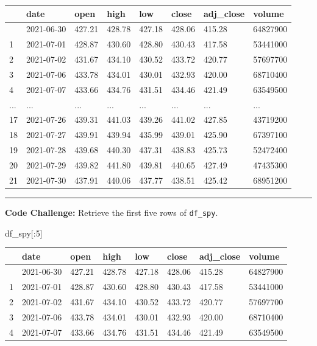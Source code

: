 \documentclass[
  letterpaper,
  DIV=11,
  numbers=noendperiod]{scrreprt}
\newenvironment{Shaded}{\begin{snugshade}}{\end{snugshade}}
\newcommand{\DecValTok}[1]{\textcolor[rgb]{0.68,0.00,0.00}{#1}}
\newcommand{\NormalTok}[1]{\textcolor[rgb]{0.00,0.23,0.31}{#1}}
\begin{document}
\begin{longtable}[]{@{}llllllll@{}}
\toprule\noalign{}
& date & open & high & low & close & adj\_close & volume \\
\midrule\noalign{}
\endhead
\bottomrule\noalign{}
\endlastfoot
0 & 2021-06-30 & 427.21 & 428.78 & 427.18 & 428.06 & 415.28 &
64827900 \\
1 & 2021-07-01 & 428.87 & 430.60 & 428.80 & 430.43 & 417.58 &
53441000 \\
2 & 2021-07-02 & 431.67 & 434.10 & 430.52 & 433.72 & 420.77 &
57697700 \\
3 & 2021-07-06 & 433.78 & 434.01 & 430.01 & 432.93 & 420.00 &
68710400 \\
4 & 2021-07-07 & 433.66 & 434.76 & 431.51 & 434.46 & 421.49 &
63549500 \\
... & ... & ... & ... & ... & ... & ... & ... \\
17 & 2021-07-26 & 439.31 & 441.03 & 439.26 & 441.02 & 427.85 &
43719200 \\
18 & 2021-07-27 & 439.91 & 439.94 & 435.99 & 439.01 & 425.90 &
67397100 \\
19 & 2021-07-28 & 439.68 & 440.30 & 437.31 & 438.83 & 425.73 &
52472400 \\
20 & 2021-07-29 & 439.82 & 441.80 & 439.81 & 440.65 & 427.49 &
47435300 \\
21 & 2021-07-30 & 437.91 & 440.06 & 437.77 & 438.51 & 425.42 &
68951200 \\
\end{longtable}

\begin{center}\rule{0.5\linewidth}{0.5pt}\end{center}

\textbf{Code Challenge:} Retrieve the first five rows of
\texttt{df\_spy}.

\begin{Shaded}
\begin{Highlighting}[]
\NormalTok{df\_spy[:}\DecValTok{5}\NormalTok{]}
\end{Highlighting}
\end{Shaded}

\begin{longtable}[]{@{}llllllll@{}}
\toprule\noalign{}
& date & open & high & low & close & adj\_close & volume \\
\midrule\noalign{}
\endhead
\bottomrule\noalign{}
\endlastfoot
0 & 2021-06-30 & 427.21 & 428.78 & 427.18 & 428.06 & 415.28 &
64827900 \\
1 & 2021-07-01 & 428.87 & 430.60 & 428.80 & 430.43 & 417.58 &
53441000 \\
2 & 2021-07-02 & 431.67 & 434.10 & 430.52 & 433.72 & 420.77 &
57697700 \\
3 & 2021-07-06 & 433.78 & 434.01 & 430.01 & 432.93 & 420.00 &
68710400 \\
4 & 2021-07-07 & 433.66 & 434.76 & 431.51 & 434.46 & 421.49 &
63549500 \\
\end{longtable}
\end{document}

